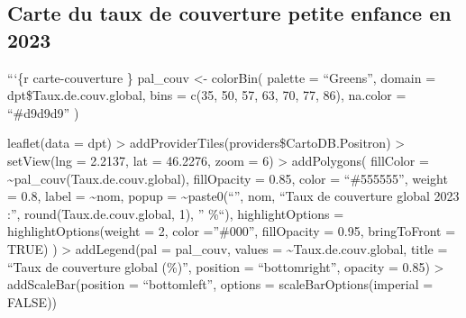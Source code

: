 \documentclass[
  letterpaper,
  DIV=11,
  numbers=noendperiod]{scrartcl}
\begin{document}
\subsection{Carte du taux de couverture petite enfance en
2023}\label{carte-du-taux-de-couverture-petite-enfance-en-2023}

```\{r carte-couverture \} pal\_couv \textless- colorBin( palette =
``Greens'', domain = dpt\$Taux.de.couv.global, bins = c(35, 50, 57, 63,
70, 77, 86), na.color = ``\#d9d9d9'' )

leaflet(data = dpt) \textbar\textgreater{}
addProviderTiles(providers\$CartoDB.Positron) \textbar\textgreater{}
setView(lng = 2.2137, lat = 46.2276, zoom = 6) \textbar\textgreater{}
addPolygons( fillColor = \textasciitilde pal\_couv(Taux.de.couv.global),
fillOpacity = 0.85, color = ``\#555555'', weight = 0.8, label =
\textasciitilde nom, popup = \textasciitilde paste0(``'', nom, ``Taux de
couverture global 2023 :'', round(Taux.de.couv.global, 1), '' \%``),
highlightOptions = highlightOptions(weight = 2, color =''\#000'',
fillOpacity = 0.95, bringToFront = TRUE) ) \textbar\textgreater{}
addLegend(pal = pal\_couv, values = \textasciitilde Taux.de.couv.global,
title = ``Taux de couverture global (\%)'', position = ``bottomright'',
opacity = 0.85) \textbar\textgreater{} addScaleBar(position =
``bottomleft'', options = scaleBarOptions(imperial = FALSE))
\end{document}
